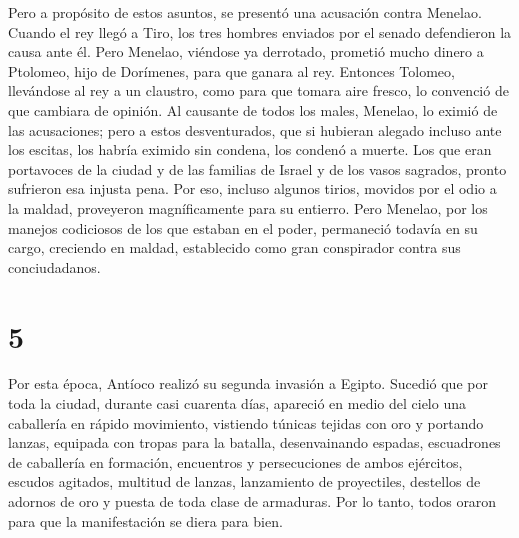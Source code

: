  Pero a propósito de estos asuntos, se presentó una
acusación contra Menelao.  Cuando el rey llegó a Tiro,
los tres hombres enviados por el senado defendieron la causa ante él.
 Pero Menelao, viéndose ya derrotado, prometió mucho
dinero a Ptolomeo, hijo de Dorímenes, para que ganara al rey.
 Entonces Tolomeo, llevándose al rey a un claustro, como
para que tomara aire fresco, lo convenció de que cambiara de opinión.
 Al causante de todos los males, Menelao, lo eximió de
las acusaciones; pero a estos desventurados, que si hubieran alegado
incluso ante los escitas, los habría eximido sin condena, los condenó a
muerte.  Los que eran portavoces de la ciudad y de las
familias de Israel y de los vasos sagrados, pronto sufrieron esa injusta
pena.  Por eso, incluso algunos tirios, movidos por el
odio a la maldad, proveyeron magníficamente para su entierro.
 Pero Menelao, por los manejos codiciosos de los que
estaban en el poder, permaneció todavía en su cargo, creciendo en
maldad, establecido como gran conspirador contra sus conciudadanos.

\hypertarget{section-4}{%
\section{5}\label{section-4}}

 Por esta época, Antíoco realizó su segunda invasión a
Egipto.  Sucedió que por toda la ciudad, durante casi
cuarenta días, apareció en medio del cielo una caballería en rápido
movimiento, vistiendo túnicas tejidas con oro y portando lanzas,
equipada con tropas para la batalla,  desenvainando
espadas, escuadrones de caballería en formación, encuentros y
persecuciones de ambos ejércitos, escudos agitados, multitud de lanzas,
lanzamiento de proyectiles, destellos de adornos de oro y puesta de toda
clase de armaduras.  Por lo tanto, todos oraron para que
la manifestación se diera para bien.


